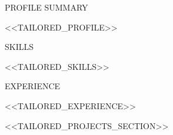 \documentclass{resume} %
\begin{document}

\begin{rSection}{PROFILE SUMMARY}

<<TAILORED_PROFILE>>

\end{rSection}



\begin{rSection}{SKILLS}

<<TAILORED_SKILLS>>

\end{rSection}



\begin{rSection}{EXPERIENCE}

<<TAILORED_EXPERIENCE>>

\end{rSection}


<<TAILORED_PROJECTS_SECTION>>

\end{document}
